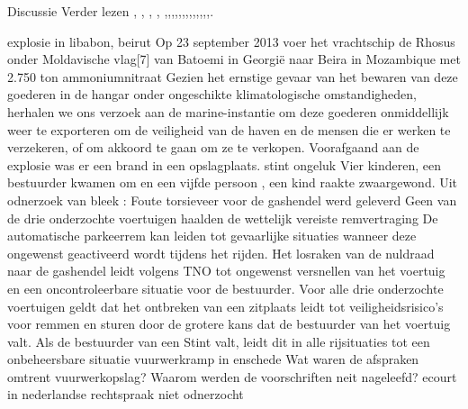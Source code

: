\cite{Whitehead2017ukrainepoweroutage}
{Discussie}
{Verder lezen}
\cite{shahzad2014ScadaProtocolsPollingScenario},
\cite{grammatikis2019AttackIEC6087505104},
\cite{2017win32industroyer},
\cite{yadav2020reviewScadaArchitecture},
\cite{arrizabalaga2020surveyiiotProtocols},\cite{fauri2017EncryptionICS},\cite{resch31102019IEC62351secureCommunication},\cite{levalle2020FuzzingICSProtocols},\cite{blackhatusa2017},\cite{blackhatusa2017},\cite{abb30062017crashoverridenotification},\cite{spinner2018crashoverrideiot},\cite{njccicthreat08102017crashovverrideprofile},\cite{slowikvb2018crashoverride},\cite{crashoverridenetwork},\cite{wikiindustroyer},\cite{icsSecurityRussianHacking},\cite{holappa2017threattoElectricityNetworks}.

  explosie in libabon, beirut 
Op 23 september 2013 voer het vrachtschip de Rhosus onder Moldavische vlag[7] van Batoemi in Georgië naar Beira in Mozambique met 2.750 ton ammoniumnitraat
Gezien het ernstige gevaar van het bewaren van deze goederen in de hangar onder ongeschikte klimatologische omstandigheden, herhalen we ons verzoek aan de marine-instantie om deze goederen onmiddellijk weer te exporteren om de veiligheid van de haven en de mensen die er werken te verzekeren, of om akkoord te gaan om ze te verkopen.
Voorafgaand aan de explosie was er een brand in een opslagplaats. 
\cite{hrw03082021investigateBeirutBlast}
\cite{souaibyElHussein112020Beirutstory}
\cite{ifrc2020chemicalexplosionBeirutPort}
\newline \indent  stint ongeluk
Vier kinderen, een bestuurder kwamen om en een vijfde persoon , een kind raakte zwaargewond. Uit odnerzoek van bleek :
Foute torsieveer voor de gashendel werd geleverd
Geen van de drie onderzochte voertuigen haalden de wettelijk vereiste remvertraging
De automatische parkeerrem kan leiden tot gevaarlijke situaties wanneer deze ongewenst geactiveerd wordt tijdens het rijden. 
Het losraken van de nuldraad naar de gashendel leidt volgens TNO tot ongewenst versnellen van het voertuig en een oncontroleerbare situatie voor de bestuurder.
Voor alle drie onderzochte voertuigen geldt dat het ontbreken van een zitplaats leidt tot veiligheidsrisico’s voor remmen en sturen door de grotere kans dat de bestuurder van het voertuig valt. Als de bestuurder van een Stint valt, leidt dit in alle rijsituaties tot een onbeheersbare situatie
\cite{TNOStint}
\newline \indent vuurwerkramp in enschede 
\cite{boogers092002RampenRegelsRichtlijnen}
Wat waren de afspraken omtrent vuurwerkopslag?
Waarom werden de voorschriften neit nageleefd?
\newline \indent  ecourt in nederlandse rechtspraak
niet odnerzocht


